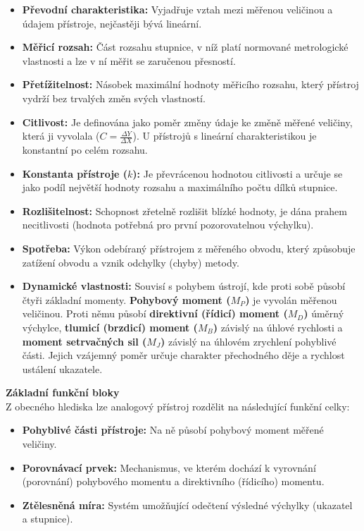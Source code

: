         \begin{itemize}
            \item \textbf{Převodní charakteristika:} Vyjadřuje vztah mezi měřenou veličinou a údajem přístroje, nejčastěji bývá lineární.
            \item \textbf{Měřicí rozsah:} Část rozsahu stupnice, v níž platí normované metrologické vlastnosti a lze v ní měřit se zaručenou přesností.
            \item \textbf{Přetížitelnost:} Násobek maximální hodnoty měřicího rozsahu, který přístroj vydrží bez trvalých změn svých vlastností.
            \item \textbf{Citlivost:} Je definována jako poměr změny údaje ke změně měřené veličiny, která ji vyvolala ($C = \frac{\Delta Y}{\Delta X}$). U přístrojů s lineární charakteristikou je konstantní po celém rozsahu.
            \item \textbf{Konstanta přístroje ($k$):} Je převrácenou hodnotou citlivosti a určuje se jako podíl největší hodnoty rozsahu a maximálního počtu dílků stupnice.
            \item \textbf{Rozlišitelnost:} Schopnost zřetelně rozlišit blízké hodnoty, je dána prahem necitlivosti (hodnota potřebná pro první pozorovatelnou výchylku).
            \item \textbf{Spotřeba:} Výkon odebíraný přístrojem z měřeného obvodu, který způsobuje zatížení obvodu a vznik odchylky (chyby) metody.
            \item \textbf{Dynamické vlastnosti:} Souvisí s pohybem ústrojí, kde proti sobě působí čtyři základní momenty. \textbf{Pohybový moment ($M_P$)} je vyvolán měřenou veličinou. Proti němu působí \textbf{direktivní (řídicí) moment ($M_D$)} úměrný výchylce, \textbf{tlumicí (brzdicí) moment ($M_B$)} závislý na úhlové rychlosti a \textbf{moment setrvačných sil ($M_J$)} závislý na úhlovém zrychlení pohyblivé části. Jejich vzájemný poměr určuje charakter přechodného děje a rychlost ustálení ukazatele.
        \end{itemize}
        \textbf{Základní funkční bloky}\\Z obecného hlediska lze analogový přístroj rozdělit na následující funkční celky:
        \begin{itemize}
            \item \textbf{Pohyblivé části přístroje:} Na ně působí pohybový moment měřené veličiny.
            \item \textbf{Porovnávací prvek:} Mechanismus, ve kterém dochází k vyrovnání (porovnání) pohybového momentu a direktivního (řídicího) momentu.
            \item \textbf{Ztělesněná míra:} Systém umožňující odečtení výsledné výchylky (ukazatel a stupnice).
        \end{itemize}
